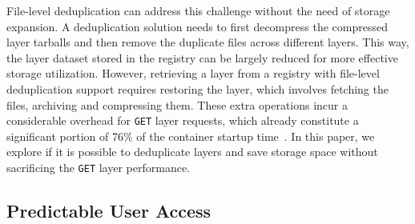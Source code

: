File-level deduplication can address this challenge without the need of storage expansion.
%
A deduplication solution needs to first decompress
the compressed layer tarballs and then remove the duplicate files across
different layers.
%
This way, the layer dataset stored in the registry can be largely reduced for more
effective storage utilization.
%
However, retrieving a layer from a registry with file-level
deduplication support requires restoring the layer,
which involves fetching the files, archiving and compressing them.
%
These extra operations incur a considerable overhead for
\texttt{GET} layer requests, which already constitute a significant portion of 76\% of
the container startup time~\cite{slacker}.
%
In this paper, we explore if it is possible to deduplicate layers and save storage space
without sacrificing the \texttt{GET} layer performance.
%   


\subsection{Predictable User Access}
\label{sec:predictable-user-access}


